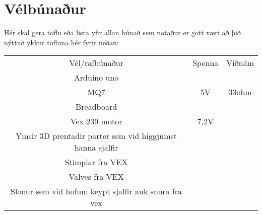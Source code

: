 \section{Vélbúnaður}
Hér skal gera töflu eða lista yfir allan búnað sem notaður er gott væri að þið nýttuð ykkur töfluna hér fyrir neðan:

\begin{center}
\begin{tabular}{ |c|c|c| } 
 \hline
 Vél/rafbúnaður &Spenna &Viðnám\\ 
 Arduino uno & &\\ 
 MQ7 &5V & 33ohm \\ 
 Breadboard & & \\
 Vex 239 motor & 7,2V & \\
 Ymsir 3D prentadir parter sem vid higgjumst hanna sjalfir \\
 Stimplar fra VEX\\
 Valves fra VEX\\
 Slonur sem vid hofum keypt sjalfir auk snura fra vex\\
 \hline
\end{tabular}
\end{center}